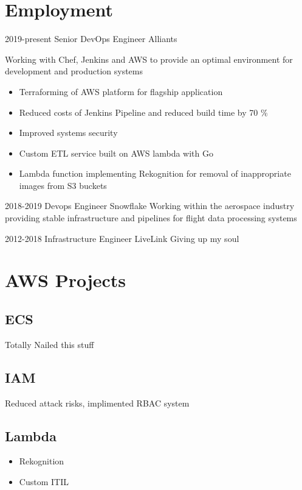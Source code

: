 \documentclass[]{friggeri-cv-a4}
\begin{document}
\section{Employment}
 \begin{entrylist}
  \entry
  	{2019-present}
  	{Senior DevOps Engineer}
  	{Alliants}
  	{Working with Chef, Jenkins and AWS to provide an optimal environment for development and production systems
      \begin{itemize}
        \item Terraforming of AWS platform for flagship application
        \item Reduced costs of Jenkins Pipeline and reduced build time by 70 \%
        \item Improved systems security
        \item Custom ETL service built on AWS lambda with Go
        \item Lambda function implementing Rekognition for removal of inappropriate images from S3 buckets
      \end{itemize}}
  \entry 
  	{2018-2019}
  	{Devops Engineer}
  	{Snowflake}
  	{Working within the aerospace industry providing stable infrastructure and pipelines for flight data processing systems}
  
  \entry
  	{2012-2018}
  	{Infrastructure Engineer}
  	{LiveLink}
  	{Giving up my soul}
 \end{entrylist}

\section{AWS Projects}
\subsection{ECS}
Totally Nailed this stuff
\subsection{IAM}
Reduced attack risks, implimented RBAC system
\subsection{Lambda}
\begin{itemize}
 			\item Rekognition
 			\item Custom ITIL
\end{itemize}
\end{document}
